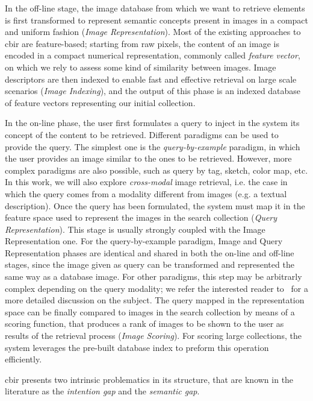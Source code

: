 In the off-line stage, the image database from which we want to retrieve elements is first transformed to represent semantic concepts present in images in a compact and uniform fashion (\emph{Image Representation}).
Most of the existing approaches to \gls{cbir} are feature-based;
starting from raw pixels, the content of an image is encoded in a compact numerical representation, commonly called \emph{feature vector}, on which we rely to assess some kind of similarity between images.
Image descriptors are then indexed to enable fast and effective retrieval on large scale scenarios (\emph{Image Indexing}), and the output of this phase is an indexed database of feature vectors representing our initial collection.

In the on-line phase, the user first formulates a query to inject in the system its concept of the content to be retrieved.
Different paradigms can be used to provide the query.
The simplest one is the \emph{query-by-example} paradigm, in which the user provides an image similar to the ones to be retrieved.
However, more complex paradigms are also possible, such as query by tag, sketch, color map, etc.
In this work, we will also explore \emph{cross-modal} image retrieval, i.e. the case in which the query comes from a modality different from images (e.g. a textual description).
Once the query has been formulated, the system must map it in the feature space used to represent the images in the search collection (\emph{Query Representation}).
This stage is usually strongly coupled with the Image Representation one.
For the query-by-example paradigm, Image and Query Representation phases are identical and shared in both the on-line and off-line stages, since the image given as query can be transformed and represented the same way as a database image.
For other paradigms, this step may be arbitrarly complex depending on the query modality;
we refer the interested reader to~\cite{zhou2017recent} for a more detailed discussion on the subject.
The query mapped in the representation space can be finally compared to images in the search collection by means of a scoring function, that produces a rank of images to be shown to the user as results of the retrieval process (\emph{Image Scoring}).
For scoring large collections, the system leverages the pre-built database index to preform this operation efficiently.

\acrlong{cbir} presents two intrinsic problematics in its structure, that are known in the literature as the \emph{intention gap} and the \emph{semantic gap}.

